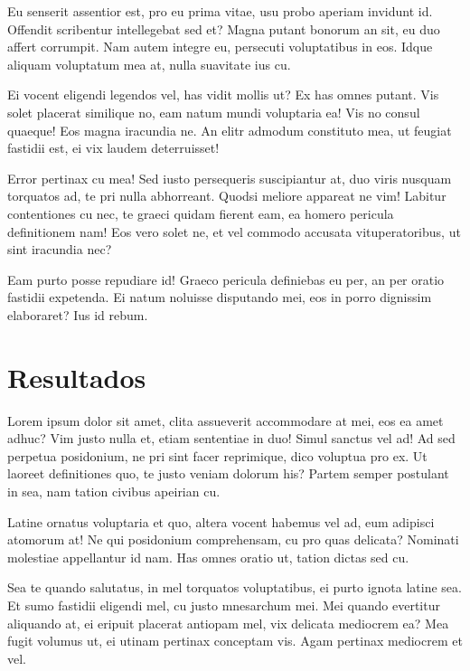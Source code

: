 \documentclass[
	12pt,				%
	openright,			%
	oneside,			%
	a4paper,			%
	english,			%
	french,				%
	spanish,			%
	brazil,				%
	]{abntex2}
\begin{document}
Eu senserit assentior est, pro eu prima vitae, usu probo aperiam invidunt id. Offendit scribentur intellegebat sed et? Magna putant bonorum an sit, eu duo affert corrumpit. Nam autem integre eu, persecuti voluptatibus in eos. Idque aliquam voluptatum mea at, nulla suavitate ius cu.

Ei vocent eligendi legendos vel, has vidit mollis ut? Ex has omnes putant. Vis solet placerat similique no, eam natum mundi voluptaria ea! Vis no consul quaeque! Eos magna iracundia ne. An elitr admodum constituto mea, ut feugiat fastidii est, ei vix laudem deterruisset!

Error pertinax cu mea! Sed iusto persequeris suscipiantur at, duo viris nusquam torquatos ad, te pri nulla abhorreant. Quodsi meliore appareat ne vim! Labitur contentiones cu nec, te graeci quidam fierent eam, ea homero pericula definitionem nam! Eos vero solet ne, et vel commodo accusata vituperatoribus, ut sint iracundia nec?

Eam purto posse repudiare id! Graeco pericula definiebas eu per, an per oratio fastidii expetenda. Ei natum noluisse disputando mei, eos in porro dignissim elaboraret? Ius id rebum.



\chapter{Resultados}
\label{ch: resultados} 

Lorem ipsum dolor sit amet, clita assueverit accommodare at mei, eos ea amet adhuc? Vim justo nulla et, etiam sententiae in duo! Simul sanctus vel ad! Ad sed perpetua posidonium, ne pri sint facer reprimique, dico voluptua pro ex. Ut laoreet definitiones quo, te justo veniam dolorum his? Partem semper postulant in sea, nam tation civibus apeirian cu.

Latine ornatus voluptaria et quo, altera vocent habemus vel ad, eum adipisci atomorum at! Ne qui posidonium comprehensam, cu pro quas delicata? Nominati molestiae appellantur id nam. Has omnes oratio ut, tation dictas sed cu.

Sea te quando salutatus, in mel torquatos voluptatibus, ei purto ignota latine sea. Et sumo fastidii eligendi mel, cu justo mnesarchum mei. Mei quando evertitur aliquando at, ei eripuit placerat antiopam mel, vix delicata mediocrem ea? Mea fugit volumus ut, ei utinam pertinax conceptam vis. Agam pertinax mediocrem et vel.
\end{document}

